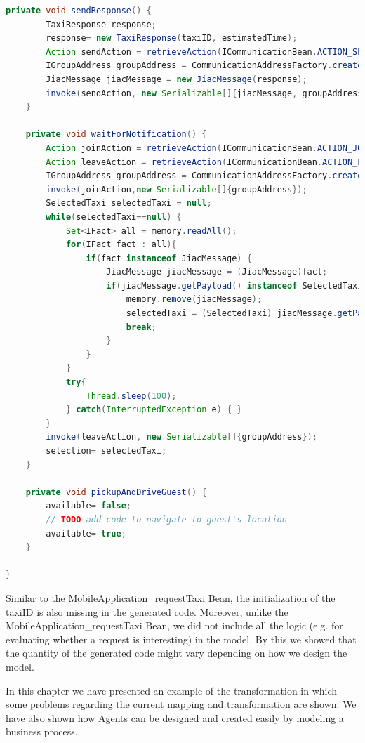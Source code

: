 \begin{lstlisting}[language=java, caption= Generated Agent Bean - ETaxi\_requestTaxi]
	private void sendResponse() {
		TaxiResponse response;
		response= new TaxiResponse(taxiID, estimatedTime);
		Action sendAction = retrieveAction(ICommunicationBean.ACTION_SEND);
		IGroupAddress groupAddress = CommunicationAddressFactory.createGroupAddress("TaxiResponseTo"+appID+"");
		JiacMessage jiacMessage = new JiacMessage(response);
		invoke(sendAction, new Serializable[]{jiacMessage, groupAddress});
	}

	private void waitForNotification() {
		Action joinAction = retrieveAction(ICommunicationBean.ACTION_JOIN_GROUP);
		Action leaveAction = retrieveAction(ICommunicationBean.ACTION_LEAVE_GROUP);
		IGroupAddress groupAddress = CommunicationAddressFactory.createGroupAddress("notification");
		invoke(joinAction,new Serializable[]{groupAddress});
		SelectedTaxi selectedTaxi = null;
		while(selectedTaxi==null) {
			Set<IFact> all = memory.readAll();
			for(IFact fact : all){
				if(fact instanceof JiacMessage) {
					JiacMessage jiacMessage = (JiacMessage)fact;
					if(jiacMessage.getPayload() instanceof SelectedTaxi && jiacMessage.getHeader(IJiacMessage.Header.SEND_TO).equals("notification")) {
						memory.remove(jiacMessage);
						selectedTaxi = (SelectedTaxi) jiacMessage.getPayload();
						break;
					}
				}
			}
			try{
				Thread.sleep(100);
			} catch(InterruptedException e) { }
		}
		invoke(leaveAction, new Serializable[]{groupAddress});
		selection= selectedTaxi;
	}

	private void pickupAndDriveGuest() {
		available= false;
		// TODO add code to navigate to guest's location
		available= true;
	}
	
}
\end{lstlisting}

Similar to the MobileApplication\_requestTaxi Bean, the initialization of the taxiID is also missing in the generated code. Moreover, unlike the MobileApplication\_requestTaxi Bean, we did not include all the logic (e.g. for evaluating whether a request is interesting) in the model. By this we showed that the quantity of the generated code might vary depending on how we design the model.


In this chapter we have presented an example of the transformation in which some problems regarding the current mapping and transformation are shown. We have also shown how Agents can be designed and created easily by modeling a business process. 
